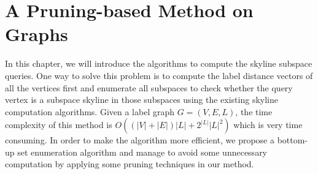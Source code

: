 
%
%

\chapter{A Pruning-based Method on Graphs}
\label{ch:graph}

In this chapter, we will introduce the algorithms to compute the skyline subspace queries. One way to solve this problem is to compute the label distance vectors of all the vertices first and enumerate all subspaces to check whether the query vertex is a subspace skyline in those subspaces using the existing skyline computation algorithms. Given a label graph $G=(V, E, L)$, the time complexity of this method is $O((|V|+|E|)|L| + 2^{|L|}|L|^2)$ which is very time consuming. In order to make the algorithm more efficient, we propose a bottom-up set enumeration algorithm and manage to avoid some unnecessary computation by applying some pruning techniques in our method.

